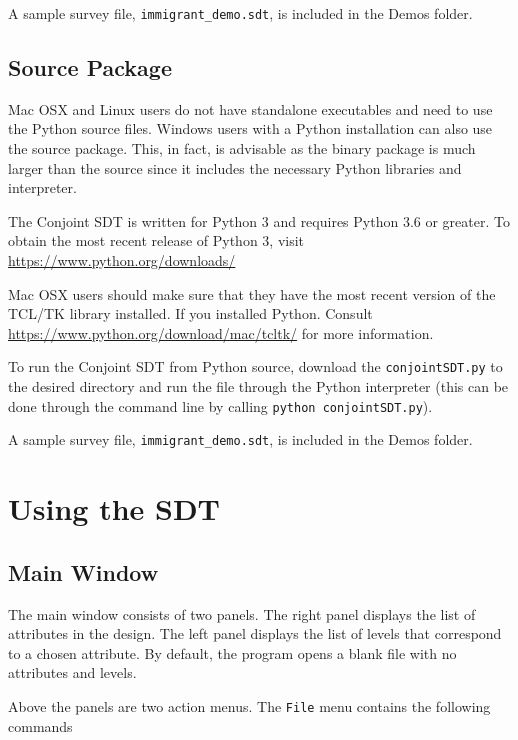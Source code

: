 \documentclass[12pt]{article}
\begin{document}
A sample survey file, \texttt{immigrant\_demo.sdt}, is included in the Demos folder. 

\subsection{Source Package}
Mac OSX and Linux users do not have standalone executables and need to use the Python source files. Windows users with a Python installation can also use the source package. This, in fact, is advisable as the binary package is much larger than the source since it includes the necessary Python libraries and interpreter. 

The Conjoint SDT is written for Python 3 and requires Python 3.6 or greater. To obtain the most recent release of Python 3, visit \href{https://www.python.org/downloads/}{https://www.python.org/downloads/} 

Mac OSX users should make sure that they have the most recent version of the TCL/TK library installed. If you installed Python. Consult \href{https://www.python.org/download/mac/tcltk/}{https://www.python.org/download/mac/tcltk/} for more information.

To run the Conjoint SDT from Python source, download the \texttt{conjointSDT.py} to the desired directory and run the file through the Python interpreter (this can be done through the command line by calling \texttt{python conjointSDT.py}).

A sample survey file, \texttt{immigrant\_demo.sdt}, is included in the Demos folder.
  

\section{Using the SDT}

\subsection{Main Window}

The main window consists of two panels. The right panel displays the list of attributes in the design. The left panel displays the list of levels that correspond to a chosen attribute. By default, the program opens a blank file with no attributes and levels.

Above the panels are two action menus. The \texttt{File} menu contains the following commands
\end{document}
